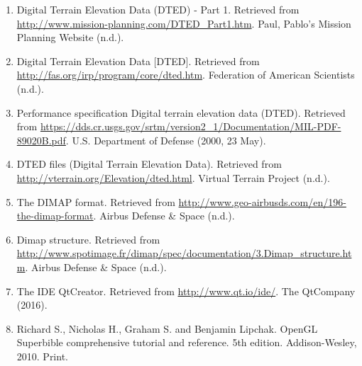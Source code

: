 \documentclass[11pt]{article}
\begin{document}
\begin{enumerate}[{(1)}]
\item Digital Terrain Elevation Data (DTED) - Part 1. Retrieved from \url{http://www.mission-planning.com/DTED_Part1.htm}. Paul, Pablo's Mission Planning Website (n.d.).

\item Digital Terrain Elevation Data [DTED]. Retrieved from \url{http://fas.org/irp/program/core/dted.htm}. Federation of American Scientists (n.d.).
 
\item Performance specification Digital terrain elevation data (DTED). Retrieved from \url{https://dds.cr.usgs.gov/srtm/version2_1/Documentation/MIL-PDF-89020B.pdf}. U.S. Department of Defense (2000, 23 May).

\item DTED files (Digital Terrain Elevation Data). Retrieved from \url{http://vterrain.org/Elevation/dted.html}. Virtual Terrain Project (n.d.).


\item The DIMAP format. Retrieved from \url{http://www.geo-airbusds.com/en/196-the-dimap-format}. Airbus Defense \& Space (n.d.).

\item Dimap structure. Retrieved from \url{http://www.spotimage.fr/dimap/spec/documentation/3.Dimap_structure.htm}. Airbus Defense \& Space (n.d.).

\item The IDE QtCreator. Retrieved from \url{http://www.qt.io/ide/}. The QtCompany (2016).

\item Richard S., Nicholas H., Graham S. and Benjamin Lipchak. OpenGL Superbible comprehensive tutorial and reference. 5th edition. Addison-Wesley, 2010. Print.
\end{enumerate}
\end{document}
